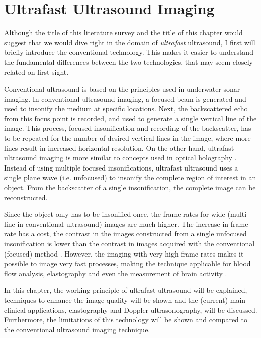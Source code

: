 \chapter{Ultrafast Ultrasound Imaging}
\label{chap:ultrafast_ultrasound}
Although the title of this literature survey and the title of this chapter would suggest that we would dive right in the domain of \textit{ultrafast} ultrasound, I first will briefly introduce the conventional technology. This makes it easier to understand the fundamental differences between the two technologies, that may seem closely related on first sight. 

Conventional ultrasound is based on the principles used in underwater sonar imaging. In conventional ultrasound imaging, a focused beam is generated and used to insonify the medium at specific locations. Next, the backscattered echo from this focus point is recorded, and used to generate a single vertical line of the image. This process, focused insonification and recording of the backscatter, has to be repeated for the number of desired vertical lines in the image, where more lines result in increased horizontal resolution. On the other hand, ultrafast ultrasound imaging is more similar to concepts used in optical holography \cite{tanter_ultrafast_2014}. Instead of using multiple focused insonifications, ultrafast ultrasound uses a single plane wave (i.e. unfocused) to insonify the complete region of interest in an object. From the backscatter of a single insonification, the complete image can be reconstructed.

Since the object only has to be insonified once, the frame rates for wide (multi-line in conventional ultrasound) images are much higher. The increase in frame rate has a cost, the contrast in the images constructed from a single unfocused insonification is lower than the contrast in images acquired with the conventional (focused) method \cite{sandrin_time-resolved_1999}. However, the imaging with very high frame rates makes it possible to image very fast processes, making the technique applicable for blood flow analysis, elastography and even the measurement of brain activity \cite{tanter_ultrafast_2014}. 

In this chapter, the working principle of ultrafast ultrasound will be explained, techniques to enhance the image quality will be shown and the (current) main clinical applications, elastography and Doppler ultrasonography, will be discussed. Furthermore, the limitations of this technology will be shown and compared to the conventional ultrasound imaging technique.




